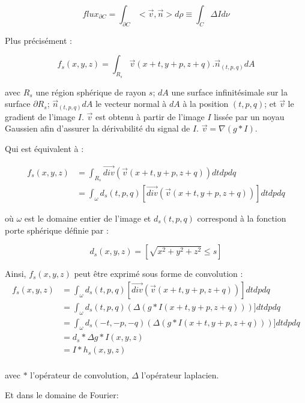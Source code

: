 \begin{equation}
  flux_{\partial C} = \int_{\partial C}< \vec{v},\vec{n} > d\rho \equiv \int_{C }\Delta I d\nu
\end{equation}

Plus précisément :

\begin{equation}
  f_s(x,y,z) = \int_{R_s}\vec{v}(x+t,y+p, z+q) . \vec{n}_{(t,p,q)}dA
\end{equation}

avec $R_s$ une région sphérique de rayon $s$; $dA$ une surface infinitésimale sur la surface $\partial R_s$; $\vec{n}_{(t,p,q)}dA$ le vecteur normal à $dA$ à la position $(t,p,q)$; et $\vec{v}$ le gradient de l'image $I$. $\vec{v}$ est obtenu à partir de l'image $I$ lissée par un noyau Gaussien afin d'assurer la dérivabilité du signal de $I$. $\vec{v}=\nabla(g*I)$.

Qui est équivalent à :

\begin{align}
  f_s(x,y,z) & = \int_{R_s} \vec{div}( \vec{v}(x+t,y+p, z+q) ) dtdpdq \\
  & = \int_{\omega} d_s(t,p,q) [\vec{div}( \vec{v}(x+t,y+p, z+q) )] dtdpdq
\end{align}

où $\omega$ est le domaine entier de l'image et $d_s(t,p,q)$ correspond à la fonction porte sphérique définie par :

\begin{equation}
d_s(x,y,z) = [\sqrt{x^2 + y^2 + z^2} \leq s]
\end{equation}

Ainsi, $f_s(x,y,z)$ peut être exprimé sous forme de convolution :
\begin{align}
  f_s(x,y,z) & = \int_{\omega} d_s(t,p,q) [\vec{div}( \vec{v}(x+t,y+p, z+q) )] dtdpdq \\
             & = \int_{\omega} d_s(t,p,q) (\Delta(g*I(x+t,y+p, z+q)))] dtdpdq \\
             & = \int_{\omega} d_s(-t,-p,-q) (\Delta(g*I(x+t,y+p, z+q)))] dtdpdq \\
             & = d_s * \Delta g * I(x,y,z) \\
             & = I * h_s(x,y,z) \\
\end{align}

avec $*$ l'opérateur de convolution, $\Delta$ l'opérateur laplacien.

Et dans le domaine de Fourier:

